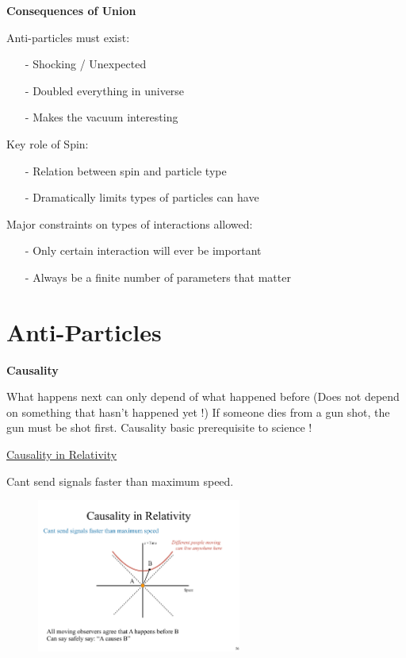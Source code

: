 {\textbf{Consequences of Union}

Anti-particles must exist:
\begin{itemize}
\item[-] Shocking / Unexpected
\item[-] Doubled everything in universe 
\item[-] Makes the vacuum interesting
\end{itemize}

Key role of Spin:
\begin{itemize}
\item[-] Relation between spin and particle type
\item[-] Dramatically limits types of particles can have
\end{itemize}

Major constraints on types of interactions allowed:
\begin{itemize}
\item[-] Only certain interaction will ever be important
\item[-] Always be a finite number of parameters that matter
\end{itemize}

\section{Anti-Particles}
\textbf{Causality}

What happens next can only depend of what happened before
(Does not depend on something that hasn't happened yet !)
If someone dies from a gun shot, the gun must be shot first.
Causality basic prerequisite to science !

\underline{Causality in Relativity}

Cant send signals faster than maximum speed.
\begin{figure}[h]
\centering
\includegraphics[width=0.6\textwidth]{./CausalityTimelike.pdf}
\end{figure}

}
